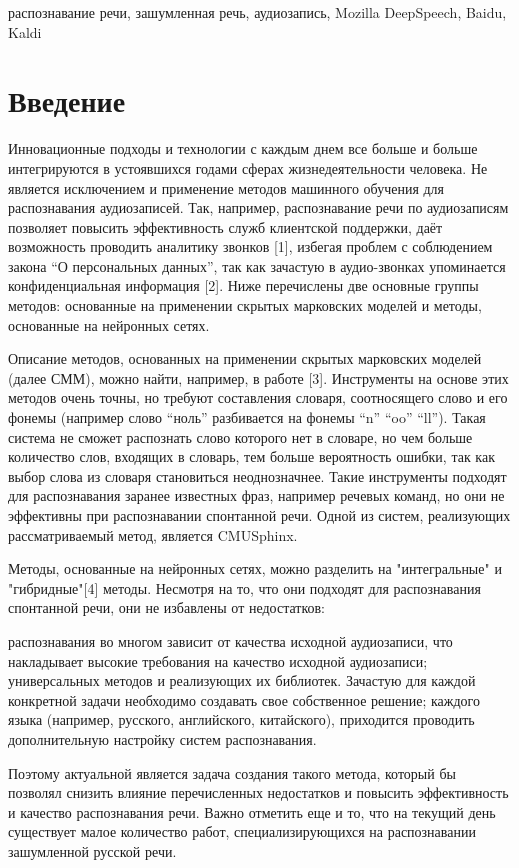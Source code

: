 \documentclass[conference]{IEEEtran}
\begin{document}
    \begin{IEEEkeywords}
        распознавание речи, зашумленная речь, аудиозапись, Mozilla DeepSpeech, Baidu, Kaldi
    \end{IEEEkeywords}


    \section{Введение}

    Инновационные подходы и технологии с каждым днем все больше и больше интегрируются в устоявшихся годами сферах жизнедеятельности человека.
    Не является исключением и применение методов машинного обучения для распознавания аудиозаписей.
    Так, например, распознавание речи по аудиозаписям позволяет повысить эффективность служб клиентской поддержки, даёт возможность проводить аналитику звонков [1],
    избегая проблем с соблюдением закона “О персональных данных”, так как зачастую в аудио-звонках упоминается конфиденциальная информация [2].
    Ниже перечислены две основные группы методов: основанные на применении скрытых марковских моделей и методы, основанные на нейронных сетях.

    Описание методов, основанных на применении скрытых марковских моделей (далее СММ), можно найти, например, в работе [3].
    Инструменты на основе этих методов очень точны, но требуют составления словаря, соотносящего слово и его фонемы (например слово “ноль” разбивается на фонемы “n” “oo” “ll”).
    Такая система не сможет распознать слово которого нет в словаре, но чем больше количество слов, входящих в словарь, тем больше вероятность ошибки, так как выбор слова из словаря становиться неоднозначнее.
    Такие инструменты подходят для распознавания заранее известных фраз, например речевых команд, но они не эффективны при распознавании спонтанной речи.
    Одной из систем, реализующих рассматриваемый метод, является CMUSphinx.

    Методы, основанные на нейронных сетях, можно разделить на "интегральные" и "гибридные"[4] методы.
    Несмотря на то, что они подходят для распознавания спонтанной речи, они не избавлены от недостатков:

    \begin{itemize}
         распознавания во многом зависит от качества исходной аудиозаписи, что накладывает высокие требования на качество исходной аудиозаписи;
         универсальных методов и реализующих их библиотек. Зачастую для каждой конкретной задачи необходимо создавать свое собственное решение;
         каждого языка (например, русского, английского, китайского), приходится проводить дополнительную настройку систем распознавания.
    \end{itemize}
    Поэтому актуальной является задача создания такого метода,
    который бы позволял снизить влияние перечисленных недостатков
    и повысить эффективность и качество распознавания речи.
    Важно отметить еще и то, что на текущий день существует малое количество работ,
    специализирующихся на распознавании зашумленной русской речи.
\end{document}
